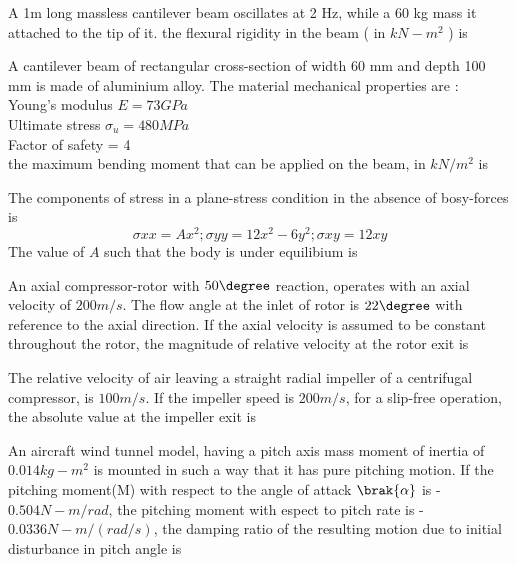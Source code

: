 	\item A 1m long massless cantilever beam oscillates at 2 Hz, while a 60 kg mass it attached to the tip of it. the flexural rigidity in the beam ( in $kN-m^2$ ) is
	\item A cantilever beam of rectangular cross-section of width 60 mm and depth 100 mm is made of aluminium alloy. The material mechanical properties are : \\
	Young's modulus $E = 73 GPa $ \\
	Ultimate stress $\sigma_{u} = 480 MPa $ \\
	Factor of safety = 4 \\
	the maximum bending moment that can be applied on the beam, in $kN/m^2$ is
	\item The components of stress in a plane-stress condition in the absence of bosy-forces is \\
	$$\sigma{xx} = Ax^2; \sigma{yy} = 12x^2 - 6y^2 ; \sigma{xy} = 12xy $$
	The value of $A$ such that the body is under equilibium is
	\item An axial compressor-rotor with $50 \degree$ reaction, operates with an axial velocity of $200 m/s$. The flow angle at the inlet of rotor is $22 \degree$ with reference to the axial direction. If the axial velocity is assumed to be constant throughout the rotor, the magnitude of relative velocity at the rotor exit is
	\item The relative velocity of air leaving a straight radial impeller of a centrifugal compressor, is $100 m/s$. If the impeller speed is $200 m/s$, for a slip-free operation, the absolute value at the impeller exit is
	\item An aircraft wind tunnel model, having a pitch axis mass moment of inertia of $0.014 kg-m^2$ is mounted in such a way that it has pure pitching motion. If the pitching moment(M) with respect to the angle of attack $\brak{\alpha}$ is -$0.504 N-m/rad$, the pitching moment with espect to pitch rate is -$0.0336 N-m/(rad/s)$, the damping ratio of the resulting motion due to initial disturbance in pitch angle is

